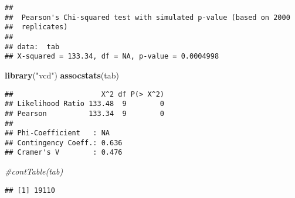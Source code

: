 \documentclass[
]{article}
\newenvironment{Shaded}{\begin{snugshade}}{\end{snugshade}}
\newcommand{\CommentTok}[1]{\textcolor[rgb]{0.56,0.35,0.01}{\textit{#1}}}
\newcommand{\DecValTok}[1]{\textcolor[rgb]{0.00,0.00,0.81}{#1}}
\newcommand{\KeywordTok}[1]{\textcolor[rgb]{0.13,0.29,0.53}{\textbf{#1}}}
\newcommand{\NormalTok}[1]{#1}
\newcommand{\OperatorTok}[1]{\textcolor[rgb]{0.81,0.36,0.00}{\textbf{#1}}}
\newcommand{\StringTok}[1]{\textcolor[rgb]{0.31,0.60,0.02}{#1}}
\begin{document}
\begin{verbatim}
## 
##  Pearson's Chi-squared test with simulated p-value (based on 2000
##  replicates)
## 
## data:  tab
## X-squared = 133.34, df = NA, p-value = 0.0004998
\end{verbatim}

\begin{Shaded}
\begin{Highlighting}[]
\KeywordTok{library}\NormalTok{(}\StringTok{"vcd"}\NormalTok{)}
\KeywordTok{assocstats}\NormalTok{(tab)}
\end{Highlighting}
\end{Shaded}

\begin{verbatim}
##                     X^2 df P(> X^2)
## Likelihood Ratio 133.48  9        0
## Pearson          133.34  9        0
## 
## Phi-Coefficient   : NA 
## Contingency Coeff.: 0.636 
## Cramer's V        : 0.476
\end{verbatim}

\begin{Shaded}
\begin{Highlighting}[]
\CommentTok{#contTable(tab)}
\end{Highlighting}
\end{Shaded}

\begin{Shaded}
\end{Shaded}

\begin{verbatim}
## [1] 19110
\end{verbatim}
\end{document}
